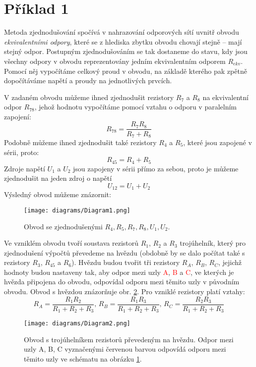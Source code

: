 \section{Příklad 1}

Metoda zjednodušování spočívá v nahrazování odporových sítí uvnitř obvodu \textit{ekvivalentními odpory}, které se z hlediska zbytku obvodu chovají stejně -- mají stejný odpor. Postupným zjednodušováním se tak dostaneme do stavu, kdy jsou všechny odpory v obvodu reprezentovány jedním ekvivalentním odporem $R_{ekv}$. Pomocí něj vypočítáme celkový proud v obvodu, na základě kterého pak zpětně dopočítáváme napětí a proudy na jednotlivých prvcích.

V zadaném obvodu můžeme ihned zjednodušit rezistory $R_{7}$ a $R_{8}$ na ekvivalentní odpor $R_{78}$, jehož hodnotu vypočítáme pomocí vztahu o odporu v paralelním zapojení:
\begin{equation} \label{eq:parallel}
    R_{78} = \frac{R_{7} R_{8}}{R_{7}+R_{8}}
\end{equation}
Podobně můžeme ihned zjednodušit také rezistory $R_{4}$ a $R_{5}$, které jsou zapojené v sérii, proto:
\[
    R_{45} = R_{4} + R_{5}
\]
Zdroje napětí $U_1$ a $U_2$ jsou zapojeny v sérii přímo za sebou, proto je můžeme zjednodušit na jeden zdroj o napětí
\[
    U_{12} = U_1 + U_2
\]
Výsledný obvod můžeme znázornit:
\begin{figure}[H]
    \centering
    \texttt{[image: diagrams/Diagram1.png]}
    \caption{Obvod se zjednodušenými $R_4,R_5,R_7,R_8,U_1,U_2$.}
    \label{fig:circ-1-1}
\end{figure}

Ve vzniklém obvodu tvoří soustava rezistorů $R_1$, $R_2$ a $R_3$ trojúhelník, který pro zjednodušení výpočtů převedeme na hvězdu (obdobně by se dalo počítat také s rezistory $R_3$, $R_{45}$ a $R_6$). Hvězdu budou tvořit tři rezistory $R_A$, $R_B$, $R_C$, jejichž hodnoty budou nastaveny tak, aby odpor mezi uzly \textcolor{red}{A}, \textcolor{red}{B} a \textcolor{red}{C}, ve kterých je hvězda připojena do obvodu, odpovídal odporu mezi těmito uzly v původním obvodu. Obvod s hvězdou znázorňuje obr. \ref{fig:circ-1-2}. Pro vzniklé rezistory platí vztahy:
\begin{equation} \label{eq:star}
R_A = \frac{R_1 R_2}{R_1+R_2+R_3},\,
R_B = \frac{R_1 R_3}{R_1+R_2+R_3},\,
R_C = \frac{R_2 R_3}{R_1+R_2+R_3}
\end{equation}
\begin{figure}[ht]
    \centering
    \texttt{[image: diagrams/Diagram2.png]}
    \caption{Obvod s trojúhelníkem rezistorů převedeným na hvězdu. Odpor mezi uzly A, B, C vyznačenými červenou barvou odpovídá odporu mezi těmito uzly ve schématu na obrázku \ref{fig:circ-1-1}.}
    \label{fig:circ-1-2}
\end{figure}

